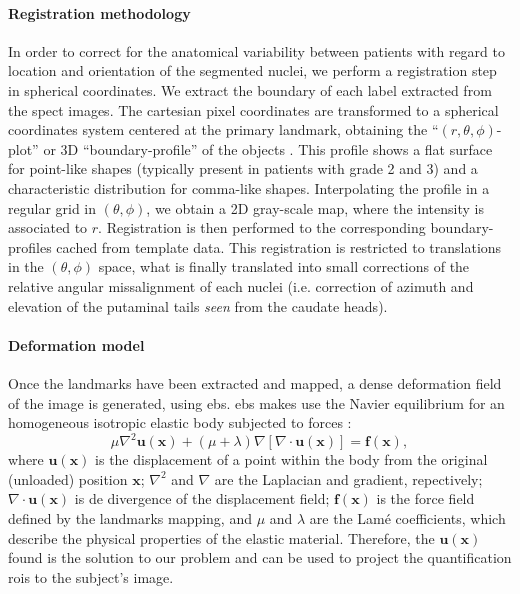 \documentclass{frontiers}
\newcommand{\cbstart}{\relax}
\newcommand{\cbend}{\relax}
\newcommand{\vect}[1]{\ensuremath{\mathbf{#1}}}
\begin{document}
\paragraph{Registration methodology}
\label{par:registration}
\cbstart
In order to correct for the anatomical variability between patients with regard to location and orientation of the segmented nuclei, we
  perform a registration step in spherical coordinates.
\cbend
We extract the boundary of each label extracted from the \gls*{spect} images. The cartesian pixel coordinates are
  transformed to a spherical coordinates system centered at the primary 
  landmark, obtaining the ``$(r,\theta,\phi)$-plot'' or 3D ``boundary-profile''
  of the objects \citep{davies_computer_2012}.
This profile shows a flat surface for point-like shapes (typically
  present in patients with grade 2 and 3) and a characteristic distribution for
  comma-like shapes. Interpolating the profile in a regular grid in $(\theta,\phi)$, 
  we obtain a 2D gray-scale map, where the intensity is associated to $r$.
Registration is then performed to the corresponding boundary-profiles cached from
  template data. This registration is restricted to translations in the
  $(\theta,\phi)$ space, what is finally translated into small corrections of
  the relative angular missalignment of each nuclei (i.e. correction of
  azimuth and elevation of the putaminal tails \emph{seen} from the caudate heads).

\paragraph{Deformation model}
\label{sec:deformation}
Once the landmarks have been extracted and mapped, a dense deformation field of the image
  is generated, using \gls*{ebs}. \gls*{ebs} makes use the Navier 
  equilibrium  for an homogeneous isotropic elastic body
  subjected to forces \citep{davis_physics-based_1997}:
  \begin{equation}
    \label{eq:ebs_pde}
    \mu \nabla^2 \vect{u}(\vect{x}) + (\mu+\lambda) \nabla \left[ \nabla \cdot \vect{u}(\vect{x}) \right] = \vect{f}(\vect{x}),
  \end{equation}
  where $\vect{u}(\vect{x})$ is the displacement of a point within the body
  from the original (unloaded) position $\vect{x}$; $\nabla^2$ and $\nabla$
  are the Laplacian and gradient, repectively; $\nabla \cdot \vect{u}(\vect{x})$
  is de divergence of the displacement field; $\vect{f}(\vect{x})$ is the force
  field defined by the landmarks mapping, and $\mu$ and $\lambda$ are the Lam\'e
  coefficients, which describe the physical properties of the elastic material.
Therefore, the $\vect{u}(\vect{x})$ found is the solution to our problem and
  can be used to project the quantification \glspl*{roi} to the subject's image.
\end{document}
